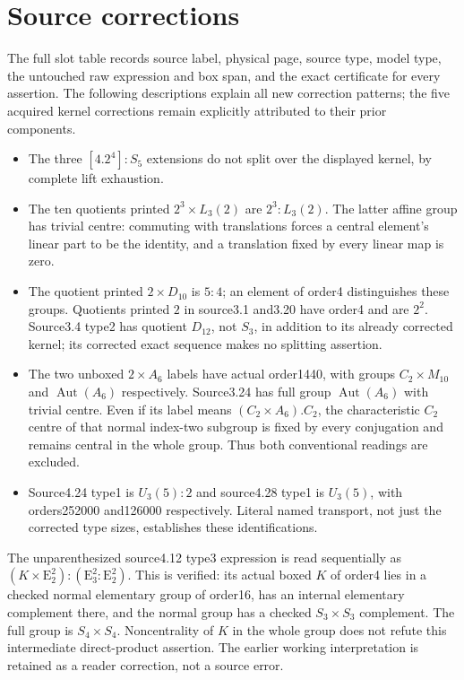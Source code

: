 \documentclass[10pt,a4paper]{article}
\newcommand{\E}{\mathrm E}\newcommand{\Aut}{\operatorname{Aut}}
\begin{document}
\section*{Source corrections}
The full slot table records source label, physical page, source type,
model type, the untouched raw expression and box span, and the exact
certificate for every assertion. The following descriptions explain all
new correction patterns; the five acquired kernel corrections remain
explicitly attributed to their prior components.
\begin{itemize}
\item The three $[4.2^4]:S_5$ extensions do not split over the displayed
kernel, by complete lift exhaustion.
\item The ten quotients printed $2^3\times L_3(2)$ are
$2^3:L_3(2)$. The latter affine group has trivial centre: commuting with
translations forces a central element's linear part to be the identity,
and a translation fixed by every linear map is zero.
\item The quotient printed $2\times D_{10}$ is $5:4$; an element of
order4 distinguishes these groups. Quotients printed $2$ in source3.1
and3.20 have order4 and are $2^2$. Source3.4 type2 has quotient $D_{12}$,
not $S_3$, in addition to its already corrected kernel; its corrected
exact sequence makes no splitting assertion.
\item The two unboxed $2\times A_6$ labels have actual order1440,
with groups $C_2\times M_{10}$ and $\Aut(A_6)$ respectively. Source3.24
has full group $\Aut(A_6)$ with trivial centre. Even if its label means
$(C_2\times A_6).C_2$, the characteristic $C_2$ centre of that normal
index-two subgroup is fixed by every conjugation and remains central in
the whole group. Thus both conventional readings are excluded.
\item Source4.24 type1 is $U_3(5):2$ and source4.28 type1 is $U_3(5)$,
with orders252000 and126000 respectively. Literal named transport, not
just the corrected type sizes, establishes these identifications.
\end{itemize}
The unparenthesized source4.12 type3 expression is read sequentially as
$(K\times\E_2^2):(\E_3^2:\E_2^2)$. This is verified: its actual boxed
$K$ of order4 lies in a checked normal elementary group of order16,
has an internal elementary complement there, and the normal group has a
checked $S_3\times S_3$ complement. The full group is $S_4\times S_4$.
Noncentrality of $K$ in the whole group does not refute this intermediate
direct-product assertion. The earlier working interpretation is retained
as a reader correction, not a source error.
\end{document}
